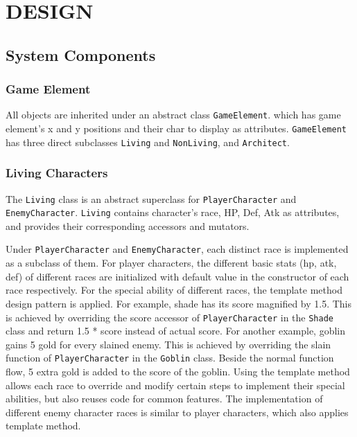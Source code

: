 \documentclass[11pt]{article}
\theoremstyle{plain} \newtheorem{theorem*}{Theorem}[subsection]
\begin{document}
\section{DESIGN} 

\subsection{System Components}

\subsubsection{Game Element}

All objects are inherited under an abstract class \texttt{GameElement}. which
has game element's x and y positions and their char to display as attributes.
\texttt{GameElement} has three direct subclasses \texttt{Living} and
\texttt{NonLiving}, and \texttt{Architect}.


\subsubsection{Living Characters}

The \texttt{Living} class is an abstract superclass for
\texttt{PlayerCharacter} and \texttt{EnemyCharacter}.  \texttt{Living} contains
character's race, HP, Def, Atk as attributes, and provides their corresponding
accessors and mutators.

Under \texttt{PlayerCharacter} and \texttt{EnemyCharacter}, each distinct race
is implemented as a subclass of them.  For player characters, the different
basic stats (hp, atk, def) of different races are initialized with default
value in the constructor of each race respectively.  For the special ability of
different races, the template method design pattern is applied. For example,
shade has its score magnified by 1.5. This is achieved by overriding the score
accessor of \texttt{PlayerCharacter} in the \texttt{Shade} class and return 1.5
* score instead of actual score. For another example, goblin gains 5 gold for
every slained enemy. This is achieved by overriding the \textsf{slain} function
of \texttt{PlayerCharacter} in the \texttt{Goblin} class.  Beside the normal
function flow, 5 extra gold is added to the score of the goblin.  Using the
template method allows each race to override and modify certain steps to
implement their special abilities, but also reuses code for common features.
The implementation of different enemy character races is similar to player
characters, which also applies template method.
\end{document}
